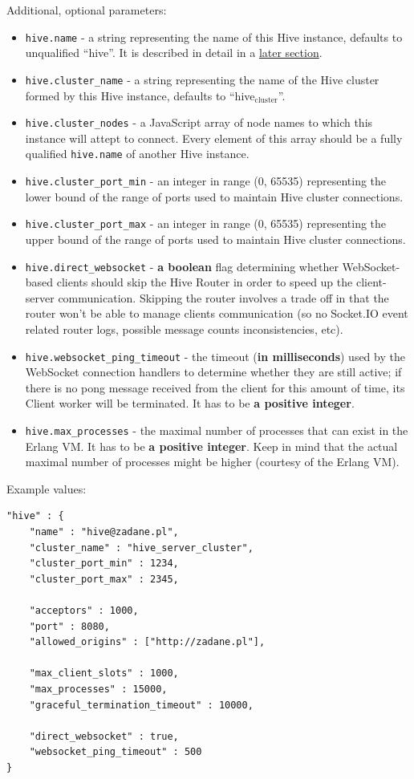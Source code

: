 \documentclass[a4paper]{article}
\begin{document}
\noindent
Additional, optional parameters:

\label{ref-cluster-config}

\begin{itemize}
\item \texttt{hive.name} - a string representing the name of this Hive instance, defaults to unqualified ``hive''. It is described in detail in a \hyperref[sec-8-2]{later section}.
\item \texttt{hive.cluster\_name} - a string representing the name of the Hive cluster formed by this Hive instance, defaults to ``hive$_{\mathrm{cluster}}$''.
\item \texttt{hive.cluster\_nodes} - a JavaScript array of node names to which this instance will attept to connect. Every element of this array should be a fully qualified \texttt{hive.name} of another Hive instance.
\item \texttt{hive.cluster\_port\_min} - an integer in range (0, 65535) representing the lower bound of the range of ports used to maintain Hive cluster connections.
\item \texttt{hive.cluster\_port\_max} - an integer in range (0, 65535) representing the upper bound of the range of ports used to maintain Hive cluster connections.
\item \texttt{hive.direct\_websocket} - \textbf{a boolean} flag determining whether WebSocket-based clients should skip the Hive Router in order to speed up the client-server communication. Skipping the router involves a trade off in that the router won't be able to manage clients communication (so no Socket.IO event related router logs, possible message counts inconsistencies, etc).
\item \texttt{hive.websocket\_ping\_timeout} - the timeout (\textbf{in milliseconds}) used by the  WebSocket connection handlers to determine whether they are still active; if there is no pong message received from the client for this amount of time, its Client worker will be terminated. It has to be \textbf{a positive integer}.
\item \texttt{hive.max\_processes} - the maximal number of processes that can exist in the Erlang VM. It has to be \textbf{a positive integer}. Keep in mind that the actual maximal number of processes might be higher (courtesy of the Erlang VM).
\end{itemize}

\noindent
Example values:


\begin{verbatim}
"hive" : {
    "name" : "hive@zadane.pl",
    "cluster_name" : "hive_server_cluster",
    "cluster_port_min" : 1234,
    "cluster_port_max" : 2345,

    "acceptors" : 1000,
    "port" : 8080,
    "allowed_origins" : ["http://zadane.pl"],

    "max_client_slots" : 1000,
    "max_processes" : 15000,
    "graceful_termination_timeout" : 10000,

    "direct_websocket" : true,
    "websocket_ping_timeout" : 500
}
\end{verbatim}
\end{document}
